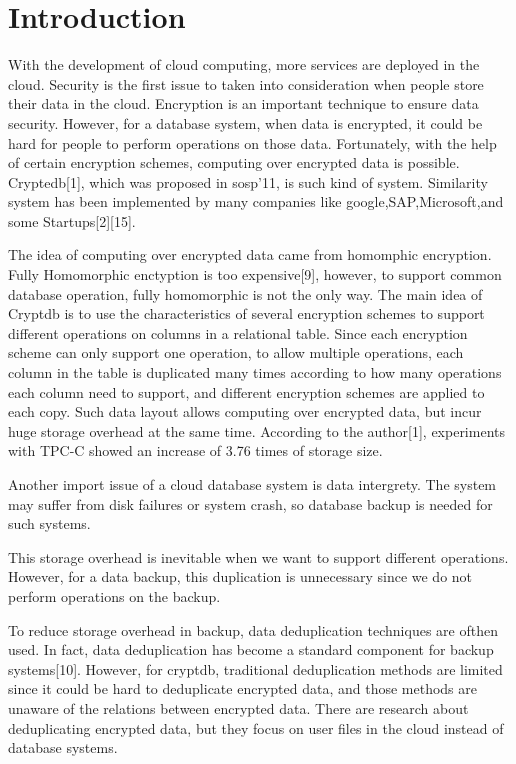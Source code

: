 \section{Introduction}

With the development of cloud computing, more services are deployed in the cloud. Security is the first issue to taken into consideration when people store their data in the cloud. Encryption is an important technique to ensure data security. However, for a database system, when data is encrypted, it could be hard for people to perform operations on those data. Fortunately, with the help of certain encryption schemes, computing over encrypted data is possible. Cryptedb[1], which was proposed in sosp'11, is such kind of system. Similarity system has been implemented by many companies like google,SAP,Microsoft,and some Startups[2][15].


The idea of computing over encrypted data came from homomphic encryption. Fully Homomorphic enctyption is too expensive[9], however, to support common database operation, fully homomorphic is not the only way. The main idea of Cryptdb is to use the characteristics of several encryption schemes to support different operations on columns in a relational table.  Since each encryption scheme can only support one operation, to allow multiple operations, each column in the table is duplicated many times according to how many operations each column need to support, and different encryption schemes are applied to each copy. Such data layout allows computing over encrypted data, but incur huge storage overhead at the same time. According to the author[1], experiments with TPC-C showed an increase of 3.76 times of storage size.

Another import issue of a cloud database system is data intergrety. The system may suffer from disk failures or system crash, so database backup is needed for such systems.

This storage overhead is inevitable when we want to support different operations. However, for a data backup, this duplication is unnecessary since we do not perform operations on the backup.

To reduce storage overhead in backup, data deduplication techniques are ofthen used. In fact, data deduplication has become a standard component for backup systems[10]. However, for cryptdb, traditional deduplication methods are limited since it could be hard to deduplicate encrypted data, and those methods are unaware of the relations between encrypted data. There are research about deduplicating encrypted data, but they focus on user files in the cloud instead of database systems. 

